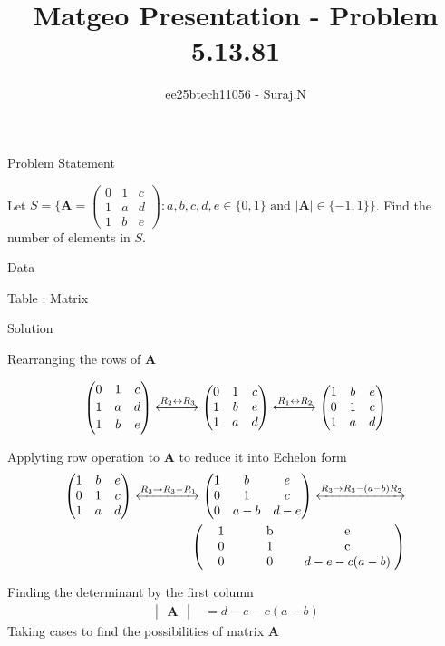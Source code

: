 \documentclass{beamer}
\title{Matgeo Presentation - Problem 5.13.81}
\author{ee25btech11056 - Suraj.N}
\numberwithin{equation}{section}
\theoremstyle{remark}
\newcommand{\myvec}[1]{\ensuremath{\begin{pmatrix}#1\end{pmatrix}}}
\newcommand{\mydet}[1]{\ensuremath{\begin{vmatrix}#1\end{vmatrix}}}
\let\vec\mathbf
\begin{document}
\begin{frame}
  \titlepage
\end{frame}

\begin{frame}{Problem Statement}

Let \(S=\{\vec{A}=\myvec{0 & 1 & c\\[2pt] 1 & a & d\\[2pt] 1 & b & e} : a,b,c,d,e\in\{0,1\}\text{ and }|\vec{A}|\in\{-1,1\}\}\).
Find the number of elements in \(S\).

\end{frame}


\begin{frame}{Data}

\begin{table}[h!]
  \centering
  
  \caption*{Table : Matrix}
  \label{5.13.81}
\end{table}

\end{frame}

\begin{frame}{Solution}

Rearranging the rows of $\vec{A}$

\begin{align}
\myvec{0 & 1 & c\\[2pt] 1 & a & d\\[2pt] 1 & b & e}
\xleftrightarrow{R_2 \leftrightarrow R_3}
\myvec{0 & 1 & c\\1 & b & e\\1 & a & d}
\xleftrightarrow{R_1 \leftrightarrow R_2}
\myvec{1 & b & e\\0 & 1 & c\\1 & a & d}
\end{align}

Applyting row operation to $\vec{A}$ to reduce it into Echelon form
\begin{align}
\myvec{1 & b & e\\0 & 1 & c\\1 & a & d}
\xleftrightarrow{R_3 \to R_3 - R_1}
\myvec{1 & b & e\\0 & 1 & c\\0 & a-b & d-e}
\xleftrightarrow{R_3 \to R_3 - (a-b)R_2}\\
\myvec{
  \makebox[1cm][c]{1} & \makebox[1cm][c]{b} & \makebox[2cm][c]{e} \\
  \makebox[1cm][c]{0} & \makebox[1cm][c]{1} & \makebox[2cm][c]{c} \\
  \makebox[1cm][c]{0} & \makebox[1cm][c]{0} & \makebox[2.6cm][c]{$d-e-c(a-b)$}
}
\end{align}

Finding the determinant by the first column 
\begin{align}
  \mydet{\vec{A}} &= d - e - c(a - b)
\end{align}
Taking cases to find the possibilities of matrix $\vec{A}$

\end{frame}
\end{document}
